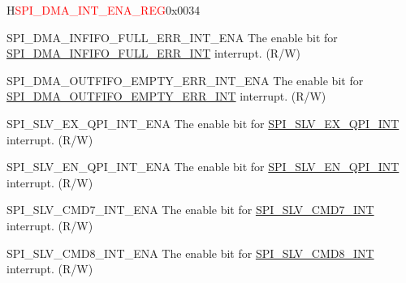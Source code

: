 \begin{register}{H}{\textcolor{red}{SPI\_DMA\_INT\_ENA\_REG}}{0x{}0034}\label{regdesc:SPIDMAINTENAREG}
%
%
%
%
%
%
%
%
%
%
%
%
%
%
%
%
%
%
%
%
%
%
\regnewline%
\begin{regdesc}\begin{reglist}
\label{fielddesc:SPIDMAINFIFOFULLERRINTENA}\item [SPI\_DMA\_INFIFO\_FULL\_ERR\_INT\_ENA] The enable bit for \hyperref[int:SPIINFIFOFULLERRINT]{SPI\_DMA\_INFIFO\_FULL\_ERR\_INT} interrupt. (R/W)
\label{fielddesc:SPIDMAOUTFIFOEMPTYERRINTENA}\item [SPI\_DMA\_OUTFIFO\_EMPTY\_ERR\_INT\_ENA] The enable bit for \hyperref[int:SPIOUTFIFOEMPTYERRINT]{SPI\_DMA\_OUTFIFO\_EMPTY\_ERR\_INT} interrupt. (R/W)
\label{fielddesc:SPISLVEXQPIINTENA}\item [SPI\_SLV\_EX\_QPI\_INT\_ENA] The enable bit for \hyperref[int:SPISLVEXQPIINT]{SPI\_SLV\_EX\_QPI\_INT} interrupt. (R/W)
\label{fielddesc:SPISLVENQPIINTENA}\item [SPI\_SLV\_EN\_QPI\_INT\_ENA] The enable bit for \hyperref[int:SPISLVENQPIINT]{SPI\_SLV\_EN\_QPI\_INT} interrupt. (R/W)
\label{fielddesc:SPISLVCMD7INTENA}\item [SPI\_SLV\_CMD7\_INT\_ENA] The enable bit for \hyperref[int:SPISLVCMD7INT]{SPI\_SLV\_CMD7\_INT} interrupt. (R/W)
\label{fielddesc:SPISLVCMD8INTENA}\item [SPI\_SLV\_CMD8\_INT\_ENA] The enable bit for \hyperref[int:SPISLVCMD8INT]{SPI\_SLV\_CMD8\_INT} interrupt. (R/W)

\end{reglist}
\end{regdesc}
\end{register}
